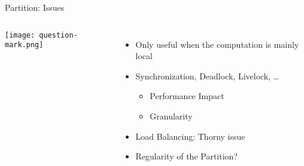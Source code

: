 \documentclass[english,compress]{beamer}
\begin{document}
\begin{frame}{Partition: Issues}
  \begin{columns}
      \texttt{[image: question-mark.png]}
      \begin{itemize}
        \item Only useful when the computation is mainly local
        \item Synchronization, Deadlock, Livelock, \dots
          \begin{itemize}
            \item Performance Impact
            \item Granularity
          \end{itemize}
        \item Load Balancing: Thorny issue
        \item Regularity of the Partition?
      \end{itemize}
  \end{columns}
\end{frame}
\end{document}
